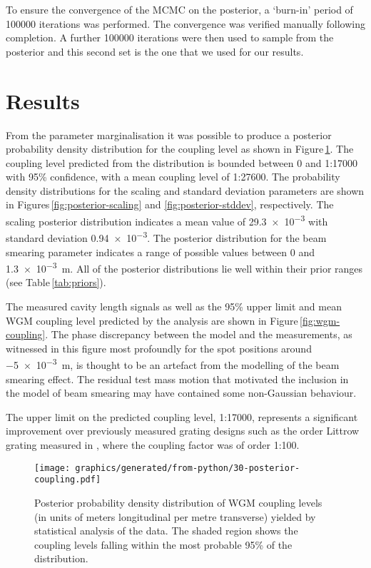 To ensure the convergence of the MCMC on the posterior, a `burn-in' period of \num{100000} iterations was performed. The convergence was verified manually following completion. A further \num{100000} iterations were then used to sample from the posterior and this second set is the one that we used for our results.

\section{Results}
\label{sec:summary}
From the parameter marginalisation it was possible to produce a posterior probability density distribution for the coupling level as shown in Figure\,\ref{fig:wgm-coupling-prob}. The coupling level predicted from the distribution is bounded between 0 and 1:17000 with 95\% confidence, with a mean coupling level of 1:27600. The probability density distributions for the scaling and standard deviation parameters are shown in Figures\,\ref{fig:posterior-scaling} and \ref{fig:posterior-stddev}, respectively. The scaling posterior distribution indicates a mean value of \num{29.3e-3} with standard deviation \num{0.94e-3}. The posterior distribution for the beam smearing parameter indicates a range of possible values between \num{0} and \SI{1.3e-3}{\meter}. All of the posterior distributions lie well within their prior ranges (see Table\,\ref{tab:priors}).

The measured cavity length signals as well as the 95\% upper limit and mean \gls{WGM} coupling level predicted by the analysis are shown in Figure\,\ref{fig:wgm-coupling}. The phase discrepancy between the model and the measurements, as witnessed in this figure most profoundly for the spot positions around \SI{-5e-3}{\meter}, is thought to be an artefact from the modelling of the beam smearing effect. The residual test mass motion that motivated the inclusion in the model of beam smearing may have contained some non-Gaussian behaviour.

The upper limit on the predicted coupling level, 1:17000, represents a significant improvement over previously measured grating designs such as the  order Littrow grating measured in \cite{Barr2011}, where the coupling factor was of order 1:100.

\begin{figure}
  \centering
  \texttt{[image: graphics/generated/from-python/30-posterior-coupling.pdf]}
  \caption{\label{fig:wgm-coupling-prob}Posterior probability density distribution of \gls{WGM} coupling levels (in units of meters longitudinal per metre transverse) yielded by statistical analysis of the data. The shaded region shows the coupling levels falling within the most probable 95\% of the distribution.}
\end{figure}

